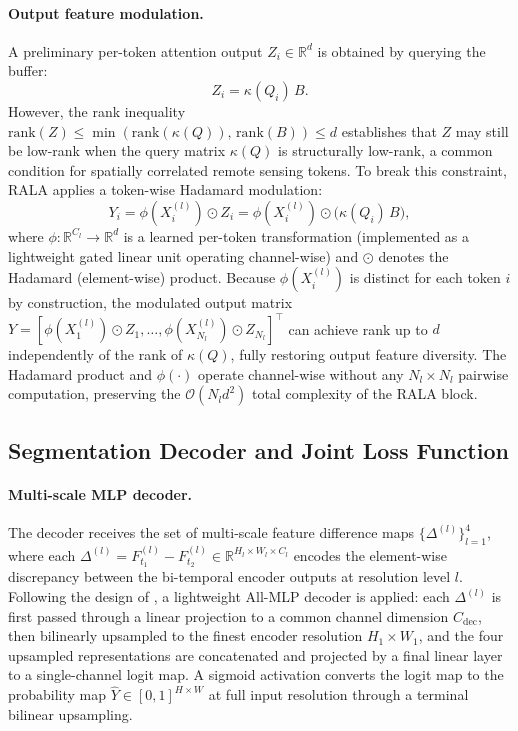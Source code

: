\paragraph{Output feature modulation.} A preliminary per-token attention output $Z_i \in \mathbb{R}^d$ is obtained by querying the buffer:
\begin{equation}
Z_i = \kappa(Q_i)\, B.
\label{eq:Z_pre_mod}
\end{equation}
However, the rank inequality $\mathrm{rank}(Z) \leq \min(\mathrm{rank}(\kappa(Q)),\, \mathrm{rank}(B)) \leq d$ establishes that $Z$ may still be low-rank when the query matrix $\kappa(Q)$ is structurally low-rank, a common condition for spatially correlated remote sensing tokens. To break this constraint, \ac{RALA} applies a token-wise Hadamard modulation:
\begin{equation}
Y_i = \phi(X_i^{(l)}) \odot Z_i = \phi(X_i^{(l)}) \odot \bigl(\kappa(Q_i)\,B\bigr),
\label{eq:hadamard_mod}
\end{equation}
where $\phi: \mathbb{R}^{C_l} \to \mathbb{R}^d$ is a learned per-token transformation (implemented as a lightweight gated linear unit operating channel-wise) and $\odot$ denotes the Hadamard (element-wise) product. Because $\phi(X_i^{(l)})$ is distinct for each token $i$ by construction, the modulated output matrix $Y = [\phi(X_1^{(l)}) \odot Z_1, \ldots, \phi(X_{N_l}^{(l)}) \odot Z_{N_l}]^\top$ can achieve rank up to $d$ independently of the rank of $\kappa(Q)$, fully restoring output feature diversity. The Hadamard product and $\phi(\cdot)$ operate channel-wise without any $N_l \times N_l$ pairwise computation, preserving the $\mathcal{O}(N_l d^2)$ total complexity of the \ac{RALA} block.

\subsection{Segmentation Decoder and Joint Loss Function}
\label{subsec:decoder-loss}

\paragraph{Multi-scale \ac{MLP} decoder.} The decoder receives the set of multi-scale feature difference maps $\{\Delta^{(l)}\}_{l=1}^{4}$, where each $\Delta^{(l)} = F_{t_1}^{(l)} - F_{t_2}^{(l)} \in \mathbb{R}^{H_l \times W_l \times C_l}$ encodes the element-wise discrepancy between the bi-temporal encoder outputs at resolution level $l$. Following the design of \cite{Bandara2022ChangeFormer}, a lightweight All-MLP decoder is applied: each $\Delta^{(l)}$ is first passed through a linear projection to a common channel dimension $C_{\mathrm{dec}}$, then bilinearly upsampled to the finest encoder resolution $H_1 \times W_1$, and the four upsampled representations are concatenated and projected by a final linear layer to a single-channel logit map. A sigmoid activation converts the logit map to the probability map $\hat{Y} \in [0,1]^{H \times W}$ at full input resolution through a terminal bilinear upsampling.


